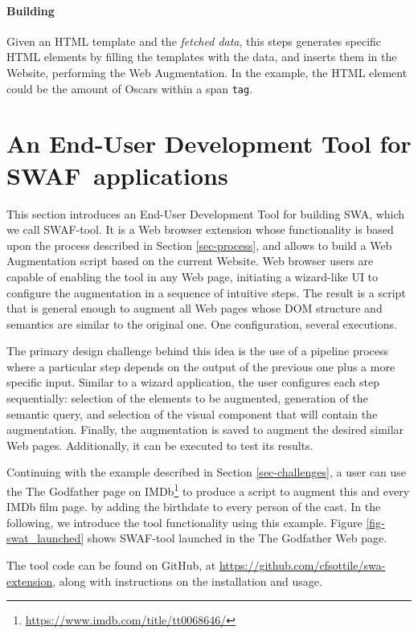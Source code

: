 \documentclass[runningheads]{llncs}
\newcommand{\SWAT}{SWAF}
\begin{document}
\paragraph{Building} Given an HTML template and the \textit{fetched data}, this steps generates specific HTML elements by filling the templates with the data, and inserts them in the Website, performing the Web Augmentation. In the example, the HTML element could be the amount of Oscars within a span \texttt{tag}.


\section{An End-User Development Tool for \SWAT~applications}
\label{sec-tool}

This section introduces an End-User Development Tool for building SWA, which we call SWAF-tool. It is a Web browser extension whose functionality is based upon the process described in Section \ref{sec-process}, and allows to build a Web Augmentation script based on the current Website. Web browser users are capable of enabling the tool in any Web page, initiating a wizard-like UI to configure the augmentation in a sequence of intuitive steps. The result is a script that is general enough to augment all Web pages whose DOM structure and semantics are similar to the original one. One configuration, several executions.

The primary design challenge behind this idea is the use of a pipeline process where a particular step depends on the output of the previous one plus a more specific input. Similar to a wizard application, the user configures each step sequentially: selection of the elements to be augmented, generation of the semantic query, and selection of the visual component that will contain the augmentation. Finally, the augmentation is saved to augment the desired similar Web pages. Additionally, it can be executed to test its results.

Continuing with the example described in Section \ref{sec-challenges}, a user can use the The Godfather page on IMDb\footnote{\url{https://www.imdb.com/title/tt0068646/}} to produce a script to augment this and every IMDb film page. by adding the birthdate to every person of the cast. In the following, we introduce the tool functionality using this example. Figure \ref{fig-swat_launched} shows SWAF-tool launched in the The Godfather Web page.

The tool code can be found on GitHub, at \url{https://github.com/cfsottile/swa-extension}, along with instructions on the installation and usage.
 
\end{document}
